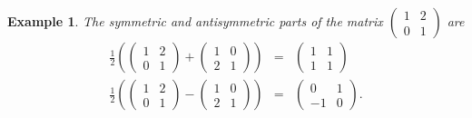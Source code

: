 \documentclass[aps,preprint]{revtex4}
\newtheorem{example}[theorem]{Example}
\begin{document}
\begin{example}
The symmetric and antisymmetric parts of the matrix $\left( 
\begin{array}{cc}
1 & 2 \\ 
0 & 1%
\end{array}%
\right) $ are 
\begin{eqnarray}
\frac{1}{2}\left( \left( 
\begin{array}{cc}
1 & 2 \\ 
0 & 1%
\end{array}%
\right) +\left( 
\begin{array}{cc}
1 & 0 \\ 
2 & 1%
\end{array}%
\right) \right) &=&\left( 
\begin{array}{cc}
1 & 1 \\ 
1 & 1%
\end{array}%
\right) \\
\frac{1}{2}\left( \left( 
\begin{array}{cc}
1 & 2 \\ 
0 & 1%
\end{array}%
\right) -\left( 
\begin{array}{cc}
1 & 0 \\ 
2 & 1%
\end{array}%
\right) \right) &=&\left( 
\begin{array}{cc}
0 & 1 \\ 
-1 & 0%
\end{array}%
\right) .
\end{eqnarray}
\end{example}
\end{document}

